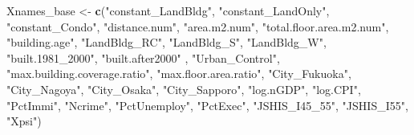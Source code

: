\documentclass[
]{article}
\newenvironment{Shaded}{\begin{snugshade}}{\end{snugshade}}
\newcommand{\KeywordTok}[1]{\textcolor[rgb]{0.13,0.29,0.53}{\textbf{#1}}}
\newcommand{\NormalTok}[1]{#1}
\newcommand{\StringTok}[1]{\textcolor[rgb]{0.31,0.60,0.02}{#1}}
\begin{document}
\begin{Shaded}
\begin{Highlighting}[]
\NormalTok{Xnames_base <-}\StringTok{ }\KeywordTok{c}\NormalTok{(}\StringTok{"constant_LandBldg"}\NormalTok{, }\StringTok{"constant_LandOnly"}\NormalTok{, }\StringTok{"constant_Condo"}\NormalTok{,}
            \StringTok{"distance.num"}\NormalTok{, }\StringTok{"area.m2.num"}\NormalTok{, }\StringTok{"total.floor.area.m2.num"}\NormalTok{,}
            \StringTok{"building.age"}\NormalTok{, }
            \StringTok{"LandBldg_RC"}\NormalTok{, }\StringTok{"LandBldg_S"}\NormalTok{, }\StringTok{"LandBldg_W"}\NormalTok{,}
            \StringTok{"built.1981_2000"}\NormalTok{, }\StringTok{"built.after2000"}\NormalTok{ ,}
            \StringTok{"Urban_Control"}\NormalTok{,  }
            \StringTok{"max.building.coverage.ratio"}\NormalTok{, }\StringTok{"max.floor.area.ratio"}\NormalTok{,}
            \StringTok{"City_Fukuoka"}\NormalTok{, }\StringTok{"City_Nagoya"}\NormalTok{, }\StringTok{"City_Osaka"}\NormalTok{, }\StringTok{"City_Sapporo"}\NormalTok{,}
            \StringTok{"log.nGDP"}\NormalTok{, }\StringTok{"log.CPI"}\NormalTok{,  }
            \StringTok{"PctImmi"}\NormalTok{, }\StringTok{"Ncrime"}\NormalTok{, }\StringTok{"PctUnemploy"}\NormalTok{, }\StringTok{"PctExec"}\NormalTok{,}
            \StringTok{"JSHIS_I45_55"}\NormalTok{, }\StringTok{"JSHIS_I55"}\NormalTok{, }\StringTok{"Xpsi"}\NormalTok{)}


\end{Highlighting}
\end{Shaded}
\end{document}
